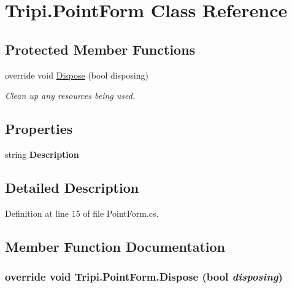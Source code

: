 \hypertarget{class_tripi_1_1_point_form}{
\section{Tripi.PointForm Class Reference}
\label{class_tripi_1_1_point_form}
}
\subsection*{Protected Member Functions}
\begin{DoxyCompactItemize}
\item 
override void \hyperlink{class_tripi_1_1_point_form_a9eacd79aef7c86ded2a59850e97edf76}{Dispose} (bool disposing)
\begin{DoxyCompactList}\small\item\em Clean up any resources being used. \item\end{DoxyCompactList}\end{DoxyCompactItemize}
\subsection*{Properties}
\begin{DoxyCompactItemize}
\item 
\hypertarget{class_tripi_1_1_point_form_a87977ed9e3ae0ac221fe54bc38db85e9}{
string {\bfseries Description}}
\label{class_tripi_1_1_point_form_a87977ed9e3ae0ac221fe54bc38db85e9}

\end{DoxyCompactItemize}


\subsection{Detailed Description}


Definition at line 15 of file PointForm.cs.

\subsection{Member Function Documentation}
\hypertarget{class_tripi_1_1_point_form_a9eacd79aef7c86ded2a59850e97edf76}{
\subsubsection[{Dispose}]{\setlength{\rightskip}{0pt plus 5cm}override void Tripi.PointForm.Dispose (bool {\em disposing})}}
\label{class_tripi_1_1_point_form_a9eacd79aef7c86ded2a59850e97edf76}


